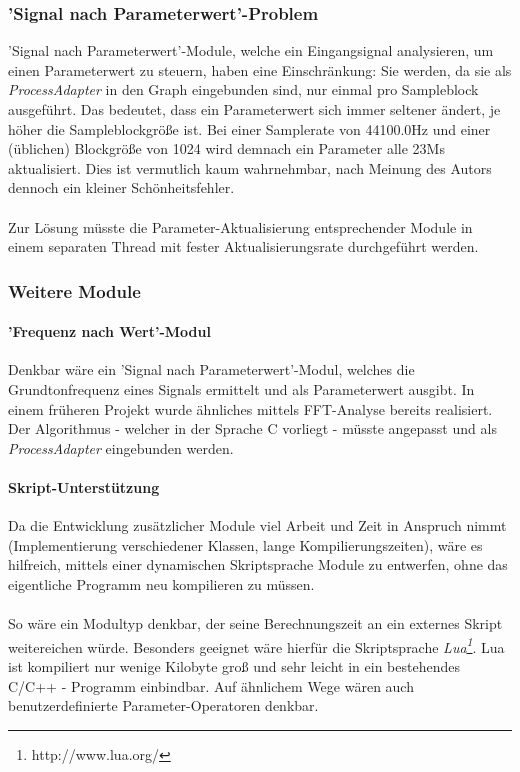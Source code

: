 \subsubsection{'Signal nach Parameterwert'-Problem}
'Signal nach Parameterwert'-Module, welche ein Eingangsignal analysieren, um einen Parameterwert zu steuern, haben eine Einschränkung: Sie werden, da sie als \emph{ProcessAdapter} in den Graph eingebunden sind, nur einmal pro Sampleblock ausgeführt. Das bedeutet, dass ein Parameterwert sich immer seltener ändert, je höher die Sampleblockgröße ist. Bei einer Samplerate von 44100.0Hz und einer (üblichen) Blockgröße von 1024 wird demnach ein Parameter alle 23Ms aktualisiert. Dies ist vermutlich kaum wahrnehmbar, nach Meinung des Autors dennoch ein kleiner Schönheitsfehler.
\\\\
Zur Lösung müsste die Parameter-Aktualisierung entsprechender Module in einem separaten Thread mit fester Aktualisierungsrate durchgeführt werden. 
\subsubsection{Weitere Module}
\paragraph{'Frequenz nach Wert'-Modul}
Denkbar wäre ein 'Signal nach Parameterwert'-Modul, welches die Grundtonfrequenz eines Signals ermittelt und als Parameterwert ausgibt. In einem früheren Projekt wurde ähnliches mittels FFT-Analyse bereits realisiert. Der Algorithmus - welcher in der Sprache C vorliegt - müsste angepasst und als \emph{ProcessAdapter} eingebunden werden.  
\paragraph{Skript-Unterstützung}
Da die Entwicklung zusätzlicher Module viel Arbeit und Zeit in Anspruch nimmt (Implementierung verschiedener Klassen, lange Kompilierungszeiten), wäre es hilfreich, mittels einer dynamischen Skriptsprache Module zu entwerfen, ohne das eigentliche Programm neu kompilieren zu müssen. 
\\\\
So wäre ein Modultyp denkbar, der seine Berechnungszeit an ein externes Skript weitereichen würde. Besonders geeignet wäre hierfür die Skriptsprache \emph{Lua\footnote{http://www.lua.org/}}. Lua ist kompiliert nur wenige Kilobyte groß und sehr leicht in ein bestehendes C/C++ - Programm einbindbar. 
Auf ähnlichem Wege wären auch benutzerdefinierte Parameter-Operatoren denkbar.

 